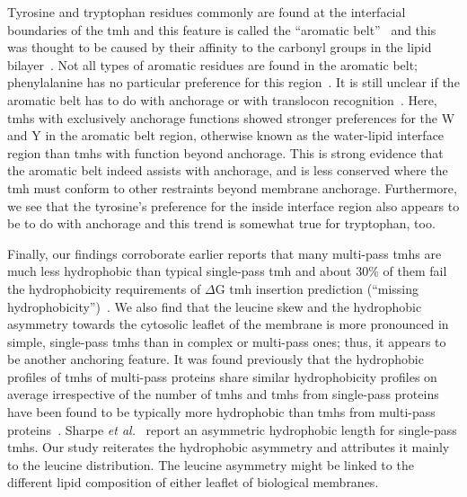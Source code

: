 Tyrosine and tryptophan residues commonly are found at the interfacial boundaries of the \gls{tmh} and this feature is called the ``aromatic belt''~\cite{Sharpe2010, Baeza-Delgado, Granseth2005, Nilsson2005, Hessa2005} and this was thought to be caused by their affinity to the carbonyl groups in the lipid bilayer~\cite{Kilian2000}. Not all types of aromatic residues are found in the aromatic belt; phenylalanine has no particular preference for this region~\cite{Granseth2005, Braun1999}. It is still unclear if the aromatic belt has to do with anchorage or with translocon recognition~\cite{Baeza-Delgado2013}. Here, \gls{tmh}s with exclusively anchorage functions showed stronger preferences for the W and Y in the aromatic belt region, otherwise known as the water-lipid interface region than \gls{tmh}s with function beyond anchorage. This is strong evidence that the aromatic belt indeed assists with anchorage, and is less conserved where the \gls{tmh} must conform to other restraints beyond membrane anchorage. Furthermore, we see that the tyrosine's preference for the inside interface region also appears to be to do with anchorage and this trend is somewhat true for tryptophan, too.

Finally, our findings corroborate earlier reports that many multi-pass \gls{tmh}s are much less hydrophobic than typical single-pass \gls{tmh} and about 30\% of them fail the hydrophobicity requirements of $\Delta$G \gls{tmh} insertion prediction (``missing hydrophobicity'')~\cite{Hessa2005, Hedin2010, Hessa2007, Ojeman2012}. We also find that the leucine skew and the hydrophobic asymmetry towards the cytosolic leaflet of the membrane is more pronounced in simple, single-pass \gls{tmh}s than in complex or multi-pass ones; thus, it appears to be another anchoring feature. It was found previously that the hydrophobic profiles of \gls{tmh}s of multi-pass proteins share similar hydrophobicity profiles on average irrespective of the number of \gls{tmh}s and \gls{tmh}s from single-pass proteins have been found to be typically more hydrophobic than \gls{tmh}s from multi-pass proteins~\cite{Wong2011}. Sharpe \textit{et al.}~\cite{Sharpe2010} report an asymmetric hydrophobic length for single-pass \gls{tmh}s. Our study reiterates the hydrophobic asymmetry and attributes it mainly to the leucine distribution. The leucine asymmetry might be linked to the different lipid composition of either leaflet of biological membranes.

